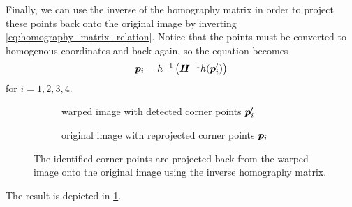 \documentclass[../main.tex]{subfiles}
\begin{document}
Finally, we can use the inverse of the homography matrix in order to project these points back onto the original image by inverting \cref{eq:homography_matrix_relation}.
Notice that the points must be converted to homogenous coordinates and back again, so the equation becomes 
\begin{equation}
    {\bm{p}}_i =
    h^{-1}\left(
        {\bm{H}}^{-1}
        h({\bm{p}}'_i)
    \right)
\end{equation}
for $i=1,2,3,4$.
\begin{figure}
    \centering
    \begin{subfigure}[t]{0.48\textwidth}
        \caption{warped image with detected corner points ${\bm{p}}'_i$}
    \end{subfigure}
    \hfill
    \begin{subfigure}[t]{0.48\textwidth}
        \caption{original image with reprojected corner points ${\bm{p}}_i$}
    \end{subfigure}
    \caption{The identified corner points are projected back from the warped image onto the original image using the inverse homography matrix.}
    \label{fig:corners_result}
\end{figure}
The result is depicted in \cref{fig:corners_result}.
\end{document}

